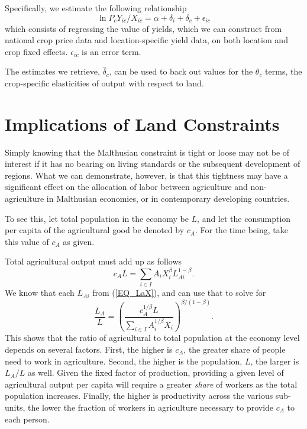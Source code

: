 \documentclass[11pt]{article}
\begin{document}
Specifically, we estimate the following relationship
\begin{equation}
	\ln P_c Y_{ic}/X_{ic} = \alpha + \delta_i + \delta_c + \epsilon_{ic}
\end{equation}
which consists of regressing the value of yields, which we can construct from national crop price data and location-specific yield data, on both location and crop fixed effects. $\epsilon_{ic}$ is an error term.

The estimates we retrieve, $\hat{\delta}_c$, can be used to back out values for the $\theta_c$ terms, the crop-specific elasticities of output with respect to land.

\section{Implications of Land Constraints}
Simply knowing that the Malthusian constraint is tight or loose may not be of interest if it has no bearing on living standards or the subsequent development of regions. What we can demonstrate, however, is that this tightness may have a significant effect on the allocation of labor between agriculture and non-agriculture in Malthusian economies, or in contemporary developing countries.

To see this, let total population in the economy be $L$, and let the consumption per capita of the agricultural good be denoted by $c_A$. For the time being, take this value of $c_A$ as given. 

Total agricultural output must add up as follows
\begin{equation}
c_A L = \sum_{i \in I} A_{i} X_{i}^{\beta} L_{Ai}^{1-\beta}.
\end{equation}
We know that each $L_{Ai}$ from (\ref{EQ_LaX}), and can use that to solve for
\begin{equation}
\frac{L_{A}}{L} = \left(\frac{c_A^{1/\beta} L}{\sum_{i \in I} A_i^{1/\beta} X_i}\right)^{\beta/(1-\beta)}.
\end{equation}
This shows that the ratio of agricultural to total population at the economy level depends on several factors. First, the higher is $c_A$, the greater share of people need to work in agriculture. Second, the higher is the population, $L$, the larger is $L_{A}/L$ as well. Given the fixed factor of production, providing a given level of agricultural output per capita will require a greater \textit{share} of workers as the total population increases. Finally, the higher is productivity across the various sub-units, the lower the fraction of workers in agriculture necessary to provide $c_A$ to each person.
\end{document}

